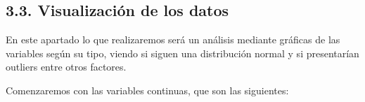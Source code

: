 \documentclass[
]{article}
\newenvironment{Shaded}{\begin{snugshade}}{\end{snugshade}}
\newcommand{\AttributeTok}[1]{\textcolor[rgb]{0.77,0.63,0.00}{#1}}
\newcommand{\ConstantTok}[1]{\textcolor[rgb]{0.00,0.00,0.00}{#1}}
\newcommand{\DecValTok}[1]{\textcolor[rgb]{0.00,0.00,0.81}{#1}}
\newcommand{\FunctionTok}[1]{\textcolor[rgb]{0.00,0.00,0.00}{#1}}
\newcommand{\NormalTok}[1]{#1}
\newcommand{\OtherTok}[1]{\textcolor[rgb]{0.56,0.35,0.01}{#1}}
\newcommand{\SpecialCharTok}[1]{\textcolor[rgb]{0.00,0.00,0.00}{#1}}
\newcommand{\StringTok}[1]{\textcolor[rgb]{0.31,0.60,0.02}{#1}}
\begin{document}
\begin{Shaded}
\end{Shaded}

\hypertarget{visualizaciuxf3n-de-los-datos}{%
\subsection{3.3. Visualización de los
datos}\label{visualizaciuxf3n-de-los-datos}}

En este apartado lo que realizaremos será un análisis mediante gráficas
de las variables según su tipo, viendo si siguen una distribución normal
y si presentarían outliers entre otros factores.

Comenzaremos con las variables continuas, que son las siguientes:
\end{document}

